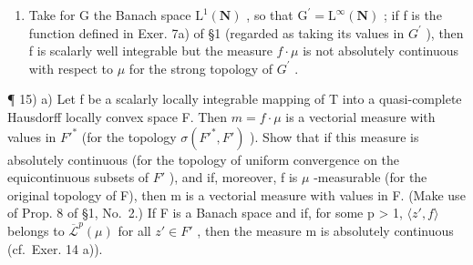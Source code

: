 \begin{enumerate}
\def\labelenumi{\alph{enumi})}
\setcounter{enumi}{1}
\tightlist
\item
  Take for G the Banach space \(\mathrm{L}^{1}(\mathbf{N})\) , so that \(\mathrm{G}^{\prime}=\mathrm{L}^{\infty}(\mathbf{N})\) ; if f is the function defined in Exer. 7a) of §1 (regarded as taking its values in \(G^{\prime}\) ), then f is scalarly well integrable but the measure \(f\cdot\mu\) is not absolutely continuous with respect to \(\mu\) for the strong topology of \(G^{\prime}\) .
\end{enumerate}

¶ 15) a) Let f be a scalarly locally integrable mapping of T into a quasi-complete Hausdorff locally convex space F. Then \(m = f \cdot \mu\) is a vectorial measure with values in \(F'^{*}\) (for the topology \(\sigma(F'^{*}, F')\) ). Show that if this measure is absolutely continuous (for the topology of uniform convergence on the equicontinuous subsets of \(F'\) ), and if, moreover, f is \(\mu\) -measurable (for the original topology of F), then m is a vectorial measure with values in F. (Make use of Prop. 8 of §1, No.~2.) If F is a Banach space and if, for some p \textgreater{} 1, \(\langle z', f \rangle\) belongs to \(\overline{\mathcal{L}}^{p}(\mu)\) for all \(z' \in F'\) , then the measure m is absolutely continuous (cf.~Exer. 14 a)).

